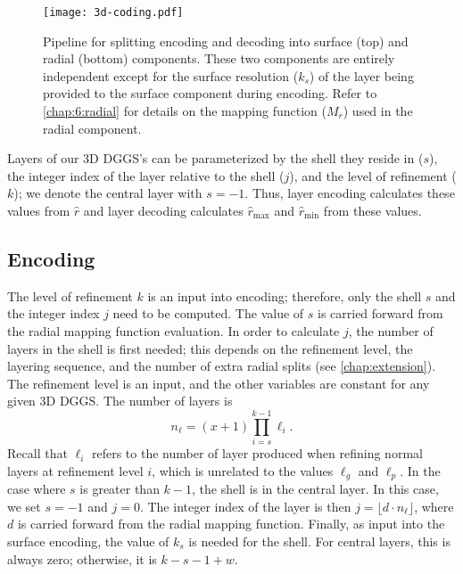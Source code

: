 \begin{figure}[htp!]
	\centering
	\texttt{[image: 3d-coding.pdf]}
	\caption[Pipeline for encoding and decoding with the grid extension method]{
		Pipeline for splitting encoding and decoding into surface (top) and radial (bottom) components.
		These two components are entirely independent except for the surface resolution ($k_s$) of the layer being provided to the surface component during encoding.
		Refer to \cref{chap:6:radial} for details on the mapping function ($M_r$) used in the radial component.
	}
	\label{fig:prismatoid-coding}
\end{figure}


Layers of our 3D DGGS's can be parameterized by the shell they reside in ($s$), the integer index of the layer relative to the shell ($j$), and the level of refinement ($k$); we denote the central layer with $s = -1$.
Thus, layer encoding calculates these values from $\hat{r}$ and layer decoding calculates $\hat{r}_\mathrm{max}$ and $\hat{r}_\mathrm{min}$ from these values.


\subsection{Encoding}
The level of refinement $k$ is an input into encoding; therefore, only the shell $s$ and the integer index $j$ need to be computed.
The value of $s$ is carried forward from the radial mapping function evaluation.
In order to calculate $j$, the number of layers in the shell is first needed; this depends on the refinement level, the layering sequence, and the number of extra radial splits (see \cref{chap:extension}).
The refinement level is an input, and the other variables are constant for any given 3D DGGS.
The number of layers is
%
\begin{equation*}
n_\ell = \left( x+1 \right) \prod_{i = s}^{k - 1} \ell_i.
\end{equation*}
%
Recall that $\ell_i$ refers to the number of layer produced when refining normal layers at refinement level $i$, which is unrelated to the values $\ell_g$ and $\ell_p$.
In the case where $s$ is greater than $k-1$, the shell is in the central layer.
In this case, we set $s = -1$ and $j = 0$.
The integer index of the layer is then $j = \lfloor d \cdot n_\ell \rfloor$, where $d$ is carried forward from the radial mapping function.
Finally, as input into the surface encoding, the value of $k_s$ is needed for the shell.
For central layers, this is always zero; otherwise, it is $k - s - 1 + w$.


